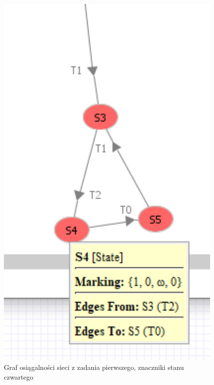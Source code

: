 \documentclass{article}
\begin{document}
        \begin{figure}[h!]
            \centering
            \includegraphics[width=14cm]{lab6/n1_3.png}
            \caption{Graf osiągalności sieci z zadania pierwszego, znaczniki stanu czwartego}
        \end{figure}\\
\end{document}
